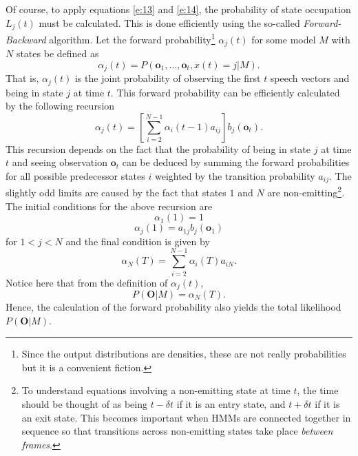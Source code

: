 Of course, to apply equations \ref{e:13} and \ref{e:14}, the
probability of state occupation $L_j(t)$ must be calculated.
This is done efficiently using the so-called {\it Forward-Backward}
algorithm.  Let the forward probability\footnote{
Since the output distributions are densities, these are not
really probabilities but it is a convenient fiction.
}
 $\alpha_j(t)$ for some model
$M$ with $N$ states be defined as 
\begin{equation} \label{e:15}
   \alpha_j(t) = P(\bm{o}_1,\ldots,\bm{o}_t, x(t)=j | M).
\end{equation}
That is, $\alpha_j(t)$ is the joint probability of observing the
first $t$ speech vectors and being in state $j$ at time $t$.  This
forward probability can be efficiently calculated by the following
recursion
\begin{equation} \label{e:16}
    \alpha_j(t) = \left[ \sum_{i=2}^{N-1} \alpha_i(t-1) a_{ij} \right]
                     b_j(\bm{o}_t).
\end{equation}
This recursion depends on the fact that the probability
of being in state $j$ at time $t$ and seeing observation $\bm{o}_t$
can be deduced by summing the forward probabilities for all
possible predecessor states $i$ weighted by the transition
probability $a_{ij}$.  The slightly odd limits are caused by
the fact that states $1$ and $N$ are non-emitting\footnote{
To understand equations involving a non-emitting state at time $t$, the time
should be thought of as being $t-\delta t$ if it is an entry state, and $t+\delta t$
if it is an exit state.  This becomes important when HMMs are connected together
in sequence so that transitions across non-emitting states take place
\textit{between frames}.
}.   The
initial conditions for the above recursion are
\begin{equation}
    \alpha_1(1) = 1
\end{equation}
\begin{equation}
    \alpha_j(1) = a_{1j} b_j(\bm{o}_1)
\end{equation}
for $1<j<N$ and the final condition is given by
\begin{equation}
    \alpha_N(T) = \sum_{i=2}^{N-1} \alpha_i(T) a_{iN}.
\end{equation}
Notice here that from the definition of $\alpha_j(t)$, 
\begin{equation}
   P(\bm{O}|M) = \alpha_N(T).
\end{equation}
Hence, the calculation of the forward probability also
yields the total likelihood $P(\bm{O}|M)$.

